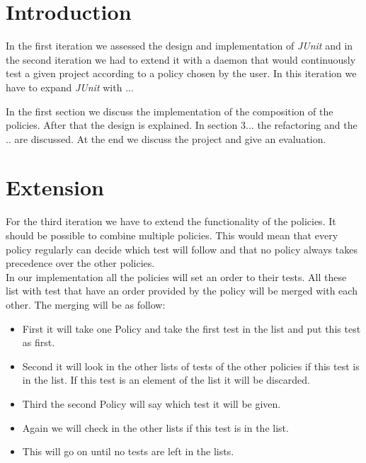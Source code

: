 \documentclass[i2]{oss}
\newcommand{\junit}{\emph{JUnit }}
\begin{document}

\maketitlepage
\newpage
\tableofcontents
\pagebreak




\section*{Introduction}
\label{ssec:introduction}
In the first iteration we assessed the design and implementation of \junit and in the second iteration we had to extend it with a daemon that would continuously test a given project according to a policy chosen by the user.
In this iteration we have to expand \junit with ...  

In the first section we discuss the implementation of the composition of the policies. 
After that the design is explained.
In section 3... the refactoring and the .. are discussed. 
At the end we discuss the project and give an evaluation.


\section{Extension}

For the third iteration we have to extend the functionality of the policies. 
It should be possible to combine multiple policies. This would mean that every policy regularly can decide which test will follow and that no policy always takes precedence over the other policies.\\

In our implementation all the policies will set an order to their tests. All these list with test that have an order provided by the policy will be merged with each other. The merging will be as follow: 
\begin{itemize}
\item First it will take one Policy and take the first test in the list and put this test as first.
\item Second it will look in the other lists of tests of the other policies if this test is in the list. If this test is an element of the list it will be discarded. 
\item Third the second Policy will say which test it will be given.
\item Again we will check in the other lists if this test is in the list.
\item This will go on until no tests are left in the lists.
\end{itemize}
\end{document}
